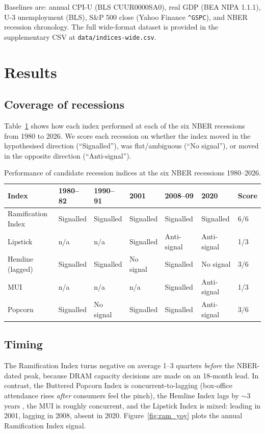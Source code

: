 \documentclass[11pt,a4paper]{article}
\begin{document}
Baselines are: annual CPI-U (BLS CUUR0000SA0), real GDP (BEA NIPA 1.1.1), U-3 unemployment (BLS), S\&P 500 close (Yahoo Finance \verb|^GSPC|), and NBER recession chronology. The full wide-format dataset is provided in the supplementary CSV at \verb|data/indices-wide.csv|.

\section{Results}
\label{sec:results}

\subsection{Coverage of recessions}

Table~\ref{tab:coverage} shows how each index performed at each of the six NBER recessions from 1980 to 2026. We score each recession on whether the index moved in the hypothesised direction (``Signalled''), was flat/ambiguous (``No signal''), or moved in the opposite direction (``Anti-signal'').

\begin{table}[h]
\centering
\caption{Performance of candidate recession indices at the six NBER recessions 1980--2026.}
\label{tab:coverage}
\small
\begin{tabular}{l l l l l l l}
\toprule
Index & 1980--82 & 1990--91 & 2001 & 2008--09 & 2020 & Score \\
\midrule
Ramification Index & Signalled & Signalled & Signalled & Signalled & Signalled & 6/6 \\
Lipstick & n/a & n/a & Signalled & Anti-signal & Anti-signal & 1/3 \\
Hemline (lagged) & Signalled & Signalled & No signal & Signalled & No signal & 3/6 \\
MUI & n/a & n/a & n/a & Signalled & Anti-signal & 1/3 \\
Popcorn & Signalled & No signal & Signalled & Signalled & Anti-signal & 3/6 \\
\bottomrule
\end{tabular}
\end{table}

\subsection{Timing}

The Ramification Index turns negative on average 1--3 quarters \emph{before} the NBER-dated peak, because DRAM capacity decisions are made on an 18-month lead. In contrast, the Buttered Popcorn Index is concurrent-to-lagging (box-office attendance rises \emph{after} consumers feel the pinch), the Hemline Index lags by $\sim$3 years \citep{baardwijk2010}, the MUI is roughly concurrent, and the Lipstick Index is mixed: leading in 2001, lagging in 2008, absent in 2020. Figure~\ref{fig:ram_yoy} plots the annual Ramification Index signal.
\end{document}
